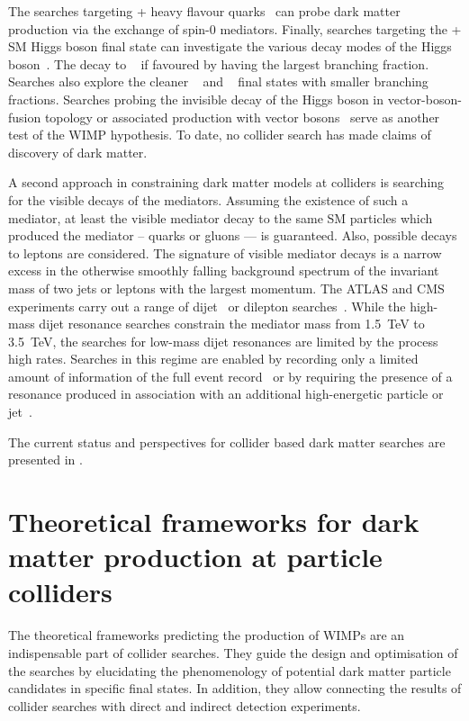 The searches targeting \met + heavy flavour quarks~\cite{SUSY-2016-18,CMS-EXO-18-010,CMS-EXO-16-051,CMS-EXO-16-049} can probe dark matter production via the exchange of spin-0 mediators.
Finally, searches targeting the \met + SM Higgs boson final state can investigate the various decay modes of the Higgs boson~\cite{CMS-EXO-18-011}. The decay to \bquarks~\cite{EXOT-2016-25,ATLAS-CONF-2018-039} if favoured by having the largest branching fraction. Searches also explore the cleaner \HepProcess{\Ph \to \Pgtpm \Pgtmp}~\cite{CMS-EXO-16-055} and \HepProcess{\Ph \to \Pgg \Pgg}~\cite{HIGG-2016-18} final states with smaller branching fractions. Searches probing the invisible decay of the Higgs boson in vector-boson-fusion topology or associated production with vector bosons~\cite{HIGG-2016-28} serve as another test of the WIMP hypothesis.
To date, no collider search has made claims of discovery of dark matter.

A second approach in constraining dark matter models at colliders is searching for the visible decays of the mediators. Assuming the existence of such a mediator, at least the visible mediator decay to the same SM particles which produced the mediator -- quarks or gluons --- is guaranteed. Also, possible decays to leptons are considered. The signature of visible mediator decays is a narrow excess in the otherwise smoothly falling background spectrum of the invariant mass of two jets or leptons with the largest momentum. The ATLAS and CMS experiments carry out a range of dijet~\cite{EXOT-2019-03,CMS-EXO-16-032} or dilepton searches~\cite{CMS-EXO-16-056,}. While the high-mass dijet resonance searches constrain the mediator mass from \SI{1.5}{\tera\electronvolt} to \SI{3.5}{\tera\electronvolt}, the searches for low-mass dijet resonances are limited by the process high rates. Searches in this regime are enabled by recording only a limited amount of information of the full event record~\cite{EXOT-2016-20} or by requiring the presence of a resonance produced in association with an additional high-energetic particle or jet~\cite{EXOT-2018-05}.

The current status and perspectives for collider based dark matter searches are presented in .


\section{Theoretical frameworks for dark matter production at particle colliders}
\label{sec:dm:models}
The theoretical frameworks predicting the production of WIMPs are an indispensable part of collider searches. They guide the design and optimisation of the searches by elucidating the phenomenology of potential dark matter particle candidates in specific final states. In addition, they allow connecting the results of collider searches with direct and indirect detection experiments.


